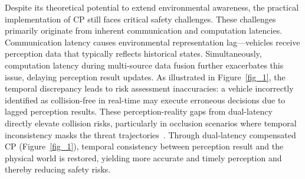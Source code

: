 Despite its theoretical potential to extend environmental awareness, the practical implementation of CP still faces critical safety challenges. These challenges primarily originate from inherent communication and computation latencies. Communication latency causes environmental representation lag—vehicles receive perception data that typically reflects historical states. Simultaneously, computation latency during multi-source data fusion further exacerbates this issue, delaying perception result updates. As illustrated in Figure~\ref{fig_1}, the temporal discrepancy leads to risk assessment inaccuracies: a vehicle incorrectly identified as collision-free in real-time may execute erroneous decisions due to lagged perception results. These perception-reality gaps from dual-latency directly elevate collision risks, particularly in occlusion scenarios where temporal inconsistency masks the threat trajectories~\cite{shenkut2024impact,wang2024current}. Through dual-latency compensated CP (Figure~\ref{fig_1}), temporal consistency between perception result and the physical world is restored, yielding more accurate and timely perception and thereby reducing safety risks.



